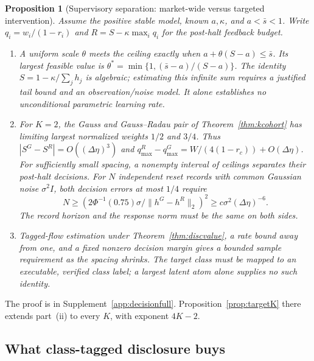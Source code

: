 \documentclass[12pt]{article}
\newtheorem{proposition}[theorem]{Proposition}
\theoremstyle{definition}
\theoremstyle{remark}
\begin{document}
\begin{proposition}[Supervisory separation: market-wide versus targeted intervention]\label{prop:target}
Assume the positive stable model, known $a,\kappa$, and $a<\bar s<1$. Write $q_i=w_i/(1-r_i)$ and $R=S-\kappa\max_iq_i$ for the post-halt feedback budget.
\begin{enumerate}[label=(\roman*),itemsep=1pt]
\item A uniform scale $\theta$ meets the ceiling exactly when $a+\theta(S-a)\le\bar s$. Its largest feasible value is $\theta^*=\min\{1,(\bar s-a)/(S-a)\}$. The identity $S=1-\kappa/\sum_jh_j$ is algebraic; estimating this infinite sum requires a justified tail bound and an observation/noise model. It alone establishes no unconditional parametric learning rate.
\item For $K=2$, the Gauss and Gauss--Radau pair of Theorem~\ref{thm:kcohort} has limiting largest normalized weights $1/2$ and $3/4$. Thus $|S^G-S^R|=O((\Delta\eta)^3)$ and $q^R_{\max}-q^G_{\max}=W/(4(1-r_c))+O(\Delta\eta)$. For sufficiently small spacing, a nonempty interval of ceilings separates their post-halt decisions. For $N$ independent reset records with common Gaussian noise $\sigma^2 I$, both decision errors at most $1/4$ require
\[
 N\ge (2\Phi^{-1}(0.75)\sigma/\|h^G-h^R\|_2)^2
 \ge c\sigma^2(\Delta\eta)^{-6}.
\]
The record horizon and the response norm must be the same on both sides.
\item Tagged-flow estimation under Theorem~\ref{thm:discvalue}, a rate bound away from one, and a fixed nonzero decision margin gives a bounded sample requirement as the spacing shrinks. The target class must be mapped to an executable, verified class label; a largest latent atom alone supplies no such identity.
\end{enumerate}
\end{proposition}
The proof is in Supplement~\ref{app:decisionfull}. Proposition~\ref{prop:targetK} there extends part~(ii) to every $K$, with exponent $4K-2$.

\subsection{What class-tagged disclosure buys}
\end{document}
